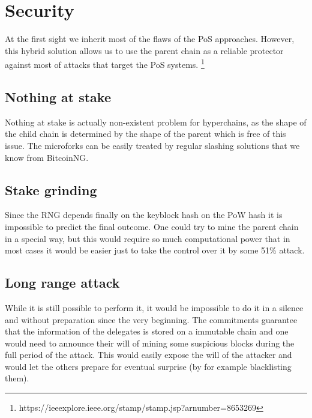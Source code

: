 \section{Security}

At the first sight we inherit most of the flaws of the PoS
approaches. However, this hybrid solution allows us to use the parent chain as a
reliable protector against most of attacks that target the PoS systems.
\footnote{https://ieeexplore.ieee.org/stamp/stamp.jsp?arnumber=8653269}

\subsection{Nothing at stake}

Nothing at stake is actually non-existent problem for hyperchains, as the shape
of the child chain is determined by the shape of the parent which is free of
this issue. The microforks can be easily treated by regular slashing solutions
that we know from BitcoinNG.

\subsection{Stake grinding}

Since the RNG depends finally on the keyblock hash on the PoW hash it is
impossible to predict the final outcome. One could try to mine the parent chain
in a special way, but this would require so much computational power that in
most cases it would be easier just to take the control over it by some 51\%
attack.

\subsection{Long range attack}
While it is still possible to perform it, it would be impossible to do it in a
silence and without preparation since the very beginning. The commitments
guarantee that the information of the delegates is stored on a immutable chain
and one would need to announce their will of mining some suspicious blocks during
the full period of the attack. This would easily expose the will of the attacker
and would let the others prepare for eventual surprise (by for example
blacklisting them).
